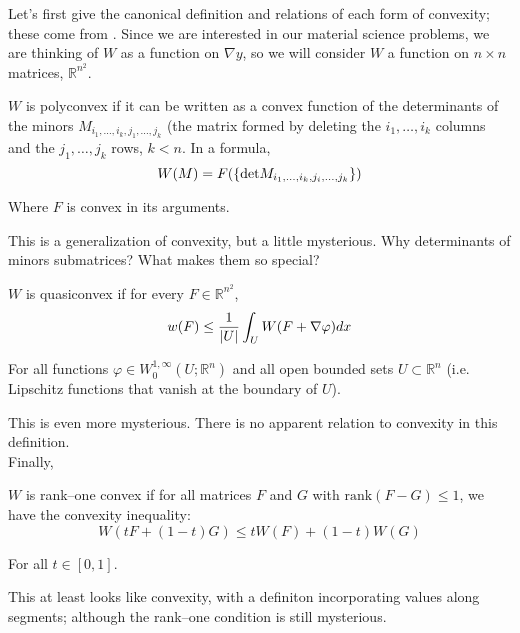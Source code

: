 \documentclass[../main.tex]{subfiles}
\begin{document}
Let's first give the canonical definition and relations of each form of convexity; these come from \cite{dacorogna_direct_2008}.
Since we are interested in our material science problems, we are thinking of $W$ as a function on $\nabla y$, so we will consider $W$ a function on $n \times n$ matrices, $\mathbb{R}^{n^2}$.


\begin{defn}[Polyconvexity]
  $W$ is polyconvex if it can be written as a convex function of the determinants of the minors $M_{i_1, \ldots, i_k, j_1, \ldots, j_k}$ (the matrix formed by deleting the $i_1, \ldots, i_k$ columns and the $j_1, \ldots, j_k$ rows, $k < n$.
  In a formula,
  \begin{equation*}
    W(M) = F( \{\mathrm{det} M_{i_1, \ldots, i_k, j_i, \ldots, j_k}\} )
  \end{equation*}

  Where $F$ is convex in its arguments.
\end{defn}

This is a generalization of convexity, but a little mysterious.
Why determinants of minors submatrices?
What makes them so special?

\begin{defn}[Quasiconvexity]
  $W$ is quasiconvex if for every $F \in \mathbb{R}^{n^2}$,
  \begin{equation*}
    w(F) \leq \frac{1}{\lvert U\rvert} \int_U W(F + \nabla \varphi) dx
  \end{equation*}

  For all functions $\varphi \in W^{1,\infty}_0(U; \mathbb{R}^n)$ and all open bounded sets $U \subset \mathbb{R}^n$ (i.e. Lipschitz functions that vanish at the boundary of $U$).
\end{defn}

This is even more mysterious.
There is no apparent relation to convexity in this definition. \\

Finally,

\begin{defn}
  $W$ is rank--one convex if for all matrices $F$ and $G$ with $\mathrm{rank}(F-G) \leq 1$, we have the convexity inequality:
  \begin{equation*}
    W(t F + (1-t) G) \leq t W(F) + (1-t) W(G)
  \end{equation*}

  For all $t \in [0,1]$.
\end{defn}

This at least looks like convexity, with a definiton incorporating values along segments; although the rank--one condition is still mysterious. \\
\end{document}

